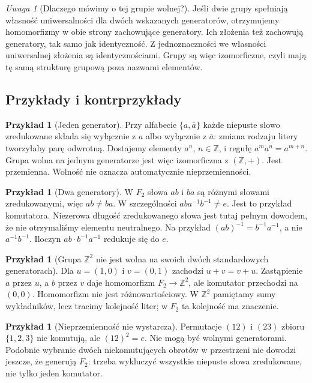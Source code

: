 \documentclass[11pt,a4paper]{article}
\numberwithin{equation}{section}
\theoremstyle{plain}
\theoremstyle{definition}
\newtheorem{przyklad}[twierdzenie]{Przykład}
\theoremstyle{remark}
\newtheorem{uwaga}[twierdzenie]{Uwaga}
\newcommand{\Z}{\mathbb Z}
\begin{document}
\begin{uwaga}[Dlaczego mówimy o tej grupie wolnej?]
Jeśli dwie grupy spełniają własność uniwersalności dla dwóch wskazanych generatorów, otrzymujemy homomorfizmy w obie strony zachowujące generatory. Ich złożenia też zachowują generatory, tak samo jak identyczność. Z jednoznaczności we własności uniwersalnej złożenia są identycznościami. Grupy są więc izomorficzne, czyli mają tę samą strukturę grupową poza nazwami elementów.
\end{uwaga}

\subsection{Przykłady i kontrprzykłady}
\begin{przyklad}[Jeden generator]
Przy alfabecie $\{a,\bar a\}$ każde niepuste słowo zredukowane składa się wyłącznie z $a$ albo wyłącznie z $\bar a$: zmiana rodzaju litery tworzyłaby parę odwrotną. Dostajemy elementy $a^n$, $n\in\Z$, i regułę $a^ma^n=a^{m+n}$. Grupa wolna na jednym generatorze jest więc izomorficzna z $(\Z,+)$. Jest przemienna. Wolność nie oznacza automatycznie nieprzemienności.
\end{przyklad}
\begin{przyklad}[Dwa generatory]
W $F_2$ słowa $ab$ i $ba$ są różnymi słowami zredukowanymi, więc $ab\ne ba$. W szczególności $aba^{-1}b^{-1}\ne e$. Jest to przykład komutatora. Niezerowa długość zredukowanego słowa jest tutaj pełnym dowodem, że nie otrzymaliśmy elementu neutralnego. Na przykład $(ab)^{-1}=b^{-1}a^{-1}$, a nie $a^{-1}b^{-1}$. Iloczyn $ab\cdot b^{-1}a^{-1}$ redukuje się do $e$.
\end{przyklad}
\begin{przyklad}[Grupa $\Z^2$ nie jest wolna na swoich dwóch standardowych generatorach]
Dla $u=(1,0)$ i $v=(0,1)$ zachodzi $u+v=v+u$. Zastąpienie $a$ przez $u$, a $b$ przez $v$ daje homomorfizm $F_2\to\Z^2$, ale komutator przechodzi na $(0,0)$. Homomorfizm nie jest różnowartościowy. W $\Z^2$ pamiętamy sumy wykładników, lecz tracimy kolejność liter; w $F_2$ ta kolejność ma znaczenie.
\end{przyklad}
\begin{przyklad}[Nieprzemienność nie wystarcza]
Permutacje $(12)$ i $(23)$ zbioru $\{1,2,3\}$ nie komutują, ale $(12)^2=e$. Nie mogą być wolnymi generatorami. Podobnie wybranie dwóch niekomutujących obrotów w przestrzeni nie dowodzi jeszcze, że generują $F_2$: trzeba wykluczyć wszystkie niepuste słowa zredukowane, nie tylko jeden komutator.
\end{przyklad}
\end{document}
